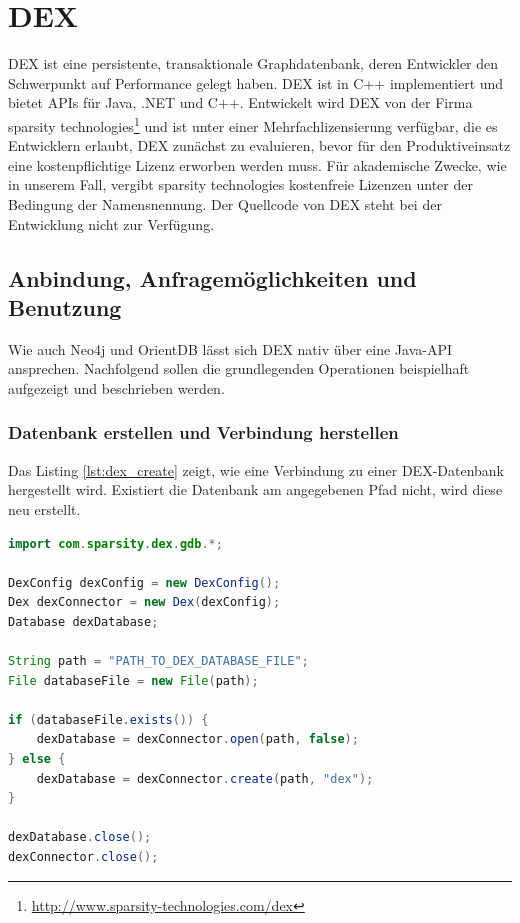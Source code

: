 \documentclass[11pt, a4paper, oneside]{article} %
\begin{document}
\section{DEX}

DEX ist eine persistente, transaktionale Graphdatenbank, deren Entwickler den Schwerpunkt auf Performance gelegt haben. DEX ist in C++ implementiert und bietet APIs für Java, .NET und C++. Entwickelt wird DEX von der Firma sparsity technologies\footnote{\url{http://www.sparsity-technologies.com/dex}} und ist unter einer Mehrfachlizensierung verfügbar, die es Entwicklern erlaubt, DEX zunächst zu evaluieren, bevor für den Produktiveinsatz eine kostenpflichtige Lizenz erworben werden muss. Für akademische Zwecke, wie in unserem Fall, vergibt sparsity technologies kostenfreie Lizenzen unter der Bedingung der Namensnennung. Der Quellcode von DEX steht bei der Entwicklung nicht zur Verfügung.

\subsection{Anbindung, Anfragemöglichkeiten und Benutzung}

Wie auch Neo4j und OrientDB lässt sich DEX nativ über eine Java-API ansprechen. Nachfolgend sollen die grundlegenden Operationen beispielhaft aufgezeigt und beschrieben werden.

\subsubsection{Datenbank erstellen und Verbindung herstellen}

Das Listing \ref{lst:dex_create} zeigt, wie eine Verbindung zu einer DEX-Datenbank hergestellt wird. Existiert die Datenbank am angegebenen Pfad nicht, wird diese neu erstellt.

\begin{lstlisting}[caption={DEX - Datenbank erstellen und Verbindung herstellen},label={lst:dex_create},language=Java]
import com.sparsity.dex.gdb.*;

DexConfig dexConfig = new DexConfig();
Dex dexConnector = new Dex(dexConfig);
Database dexDatabase;

String path = "PATH_TO_DEX_DATABASE_FILE";
File databaseFile = new File(path);

if (databaseFile.exists()) {
	dexDatabase = dexConnector.open(path, false);
} else {
	dexDatabase = dexConnector.create(path, "dex");
}

dexDatabase.close();
dexConnector.close();
\end{lstlisting}
\end{document}
